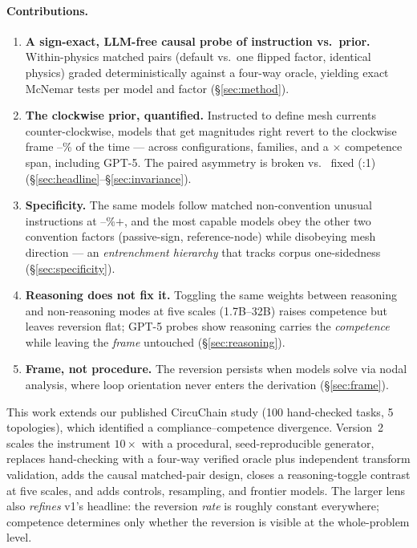 \documentclass[11pt]{article}
\begin{document}
\paragraph{Contributions.}
\begin{enumerate}
  \item \textbf{A sign-exact, LLM-free causal probe of instruction vs.\
  prior.} Within-physics matched pairs (default vs.\ one flipped factor,
  identical physics) graded deterministically against a four-way oracle,
  yielding exact McNemar tests per model and factor
  (\S\ref{sec:method}).
  \item \textbf{The clockwise prior, quantified.} Instructed to define mesh
  currents counter-clockwise, models that get magnitudes right revert to the
  clockwise frame \BandMin--\BandMax\% of the time --- across
  \NColumns{} configurations, \NFamilies{} families, and a
  \CompetenceSpanX$\times$ competence span, including GPT-5. The paired
  asymmetry is \AggB{} broken vs.\ \AggC{} fixed (\AggRatio:1)
  (\S\ref{sec:headline}--\S\ref{sec:invariance}).
  \item \textbf{Specificity.} The same models follow matched non-convention
  unusual instructions at \CtlGemmaRev--\CtlDsRev\%$+$, and the most capable
  models obey the other two convention factors (passive-sign, reference-node)
  while disobeying mesh direction --- an \emph{entrenchment hierarchy} that
  tracks corpus one-sidedness (\S\ref{sec:specificity}).
  \item \textbf{Reasoning does not fix it.} Toggling the same weights between
  reasoning and non-reasoning modes at five scales (1.7B--32B) raises
  competence but leaves reversion flat; GPT-5 probes show reasoning carries
  the \emph{competence} while leaving the \emph{frame} untouched
  (\S\ref{sec:reasoning}).
  \item \textbf{Frame, not procedure.} The reversion persists when models
  solve via nodal analysis, where loop orientation never enters the
  derivation (\S\ref{sec:frame}).
\end{enumerate}

This work extends our published CircuChain study
\cite{ravishankara2026circuchain} (100 hand-checked tasks, 5 topologies),
which identified a compliance--competence divergence. Version~2 scales the
instrument $10\times$ with a procedural, seed-reproducible generator, replaces
hand-checking with a four-way verified oracle plus independent transform
validation, adds the causal matched-pair design, closes a reasoning-toggle
contrast at five scales, and adds controls, resampling, and frontier models.
The larger lens also \emph{refines} v1's headline: the reversion \emph{rate}
is roughly constant everywhere; competence determines only whether the
reversion is visible at the whole-problem level.
\end{document}
